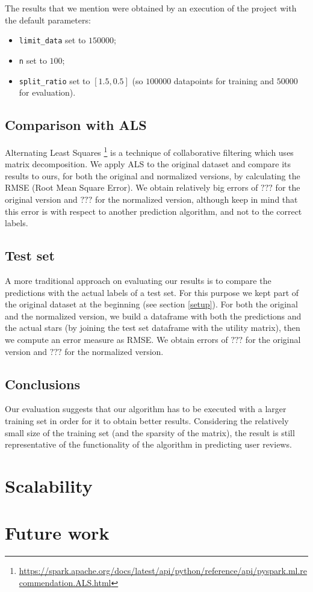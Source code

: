 \documentclass[11pt,a4paper]{article}
\newcommand{\code}{\texttt}
\begin{document}
\begin{multicols}{2}
The results that we mention were obtained by an execution of the project with the default parameters:
\begin{itemize}
	\item \code{limit\_data} set to $150 000$;
	\item \code{n} set to $100$;
	\item \code{split\_ratio} set to $[1.5, 0.5]$ (so $100 000$ datapoints for training and $50 000$ for evaluation).
\end{itemize}


\subsection{Comparison with ALS}
Alternating Least Squares \footnote{\url{https://spark.apache.org/docs/latest/api/python/reference/api/pyspark.ml.recommendation.ALS.html}} is a technique of collaborative filtering which uses matrix decomposition.
We apply ALS to the original dataset and compare its results to ours, for both the original and normalized versions, by calculating the RMSE (Root Mean Square Error).
We obtain relatively big errors of $???$ for the original version and $???$ for the normalized version, although keep in mind that this error is with respect to another prediction algorithm, and not to the correct labels.


\subsection{Test set}
A more traditional approach on evaluating our results is to compare the predictions with the actual labels of a test set.
For this purpose we kept part of the original dataset at the beginning (see section \ref{setup}).
For both the original and the normalized version, we build a dataframe with both the predictions and the actual stars (by joining the test set dataframe with the utility matrix), then we compute an error measure as RMSE.
We obtain errors of $???$ for the original version and $???$ for the normalized version.



\subsection{Conclusions}
Our evaluation suggests that our algorithm has to be executed with a larger training set in order for it to obtain better results.
Considering the relatively small size of the training set (and the sparsity of the matrix), the result is still representative of the functionality of the algorithm in predicting user reviews.



\label{scalability}
\section{Scalability}



\label{futurework}
\section{Future work}


\end{multicols}
\end{document}
